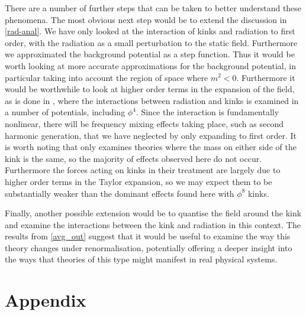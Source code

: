 \documentclass[11pt, oneside,titlepage]{article}  	%
\numberwithin{equation}{section}
\begin{document}
There are a number of further steps that can be taken to better understand these phenomena. The most obvious next step would be to extend the discussion in \textsection \ref{rad-anal}. We have only looked at the interaction of kinks and radiation to first order, with the radiation as a small perturbation to the static field. Furthermore we approximated the background potential as a step function. Thus it would be worth looking at more accurate approximations for the background potential, in particular taking into account the region of space where $m^2 < 0$. Furthermore it would be worthwhile to look at higher order terms in the expansion of the field, as is done in \cite{rad_pressure}, where the interactions between radiation and kinks is examined in a number of potentials, including $\phi^4$. Since the interaction is fundamentally nonlinear, there will be frequency mixing effects taking place, such as second harmonic generation, that we have neglected by only expanding to first order. It is worth noting that \cite{rad_pressure} only examines theories where the mass on either side of the kink is the same, so the majority of effects observed here do not occur. Furthermore the forces acting on kinks in their treatment are largely due to higher order terms in the Taylor expansion, so we may expect them to be substantially weaker than the dominant effects found here with $\phi^8$ kinks.\par
Finally, another possible extension would be to quantise the field around the kink and examine the interactions between the kink and radiation in this context. The results from \textsection \ref{avg_out} suggest that it would be useful to examine the way this theory changes under renormalisation, potentially offering a deeper insight into the ways that theories of this type might manifest in real physical systems.





 \renewcommand\thesection{}
 \renewcommand\thesubsection{\Alph{subsection}}
 \section{Appendix}
\end{document}
